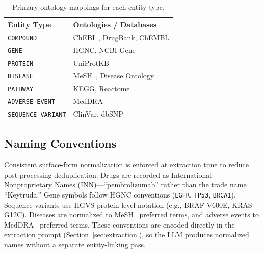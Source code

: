 \begin{table}[t]
\centering
\caption{Primary ontology mappings for each entity type.}
\label{tab:ontology-mapping}
\begin{tabular}{ll}
\toprule
\textbf{Entity Type} & \textbf{Ontologies / Databases} \\
\midrule
\texttt{COMPOUND}         & ChEBI~\cite{chebi2016}, DrugBank, ChEMBL \\
\texttt{GENE}             & HGNC, NCBI Gene \\
\texttt{PROTEIN}          & UniProtKB \\
\texttt{DISEASE}          & MeSH~\cite{mesh2000}, Disease Ontology \\
\texttt{PATHWAY}          & KEGG, Reactome \\
\texttt{ADVERSE\_EVENT}   & MedDRA~\cite{meddra1999} \\
\texttt{SEQUENCE\_VARIANT}& ClinVar, dbSNP \\
\bottomrule
\end{tabular}
\end{table}

\subsection{Naming Conventions}

Consistent surface-form normalization is enforced at extraction time to reduce post-processing deduplication.
Drugs are recorded as International Nonproprietary Names (INN)---``pembrolizumab'' rather than the trade name ``Keytruda.''
Gene symbols follow HGNC conventions (\texttt{EGFR}, \texttt{TP53}, \texttt{BRCA1}).
Sequence variants use HGVS protein-level notation (e.g., BRAF V600E, KRAS G12C).
Diseases are normalized to MeSH~\cite{mesh2000} preferred terms, and adverse events to MedDRA~\cite{meddra1999} preferred terms.
These conventions are encoded directly in the extraction prompt (Section~\ref{sec:extraction}), so the LLM produces normalized names without a separate entity-linking pass.
